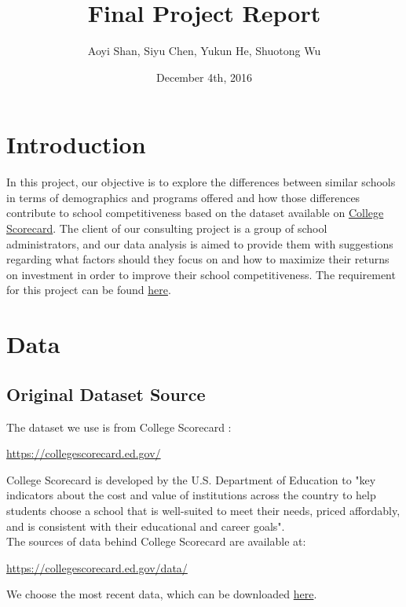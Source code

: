 \documentclass{article}
\begin{document}


\title{Final Project Report}
\author{Aoyi Shan, Siyu Chen, Yukun He, Shuotong Wu}
\date{December 4th, 2016}

\maketitle
\parindent=0pt

\section{Introduction}

In this project, our objective is to explore the differences between similar schools in terms of demographics and programs offered and how those differences contribute to school competitiveness based on the dataset available on \href{https://collegescorecard.ed.gov/data/}{College Scorecard}. The client of our consulting project is a group of school administrators, and our data analysis is aimed to provide them with suggestions regarding what factors should they focus on and how to maximize their returns on investment in order to improve their school competitiveness. The requirement for this project can be found  \href{https://github.com/ucb-stat159/stat159-fall-2016/blob/master/projects/proj03/stat159-final-project.pdf}{here}.

\section{Data}

\subsection{Original Dataset Source}

The dataset we use is from College Scorecard :
\begin{center}
\href{https://collegescorecard.ed.gov/}{https://collegescorecard.ed.gov/}
\end{center}

College Scorecard is developed by the U.S. Department of Education to "key indicators about the cost and value of institutions across the country to help students choose a school that is well-suited to meet their needs, priced affordably, and is consistent with their educational and career goals".\\

The sources of data behind College Scorecard are available at:
\begin{center}
\href{https://collegescorecard.ed.gov/data/}{https://collegescorecard.ed.gov/data/}
\end{center}
We choose the most recent data, which can be downloaded \href{https://ed-public-download.apps.cloud.gov/downloads/Most-Recent-Cohorts-All-Data-Elements.csv}{here}.\\
\end{document}

